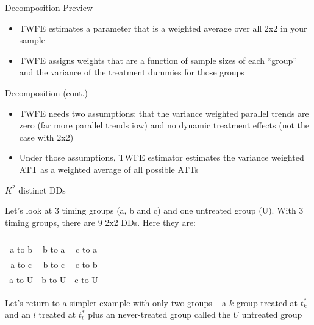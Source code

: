 \documentclass{beamer}
\begin{document}
\begin{frame}{Decomposition Preview}

\begin{itemize}
\item TWFE estimates a parameter that is a weighted average over all 2x2 in your sample
\item TWFE assigns weights that are a function of sample sizes of each ``group'' and the variance of the treatment dummies for those groups
\end{itemize}

\end{frame}

\begin{frame}{Decomposition (cont.)}

\begin{itemize}
\item TWFE needs two assumptions: that the variance weighted parallel trends are zero (far more parallel trends iow) and no dynamic treatment effects (not the case with 2x2)
\item Under those assumptions, TWFE estimator estimates the variance weighted ATT as a weighted average of all possible ATTs
\end{itemize}

\end{frame}


\begin{frame}{$K^2$ distinct DDs}

Let's look at 3 timing groups (a, b and c) and one untreated group (U).  With 3 timing groups, there are 9 2x2 DDs.  Here they are:


\begin{center}
\begin{tabular}{c|c|c}
\multicolumn{1}{l}{} &
\multicolumn{1}{l}{} &
\multicolumn{1}{l}{} \\
\midrule
a to b & b to a & c to a \\
a to c & b to c & c to b \\
a to U & b to U & c to U \\
\midrule
\end{tabular}
\end{center}

\bigskip

Let's return to a simpler example with only two groups -- a $k$ group treated at $t_k^*$ and an $l$ treated at $t_l^*$ plus an never-treated group called the $U$ untreated group
\end{frame} 
\end{document}
